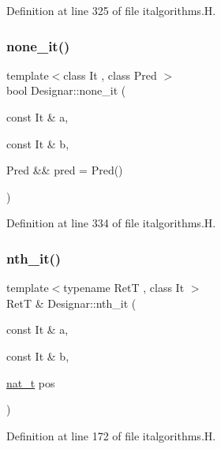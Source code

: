 Definition at line 325 of file italgorithms.\+H.

\mbox{\label{namespace_designar_a1db95e69891b9a861d56297c556a645b}} 
\subsubsection{\texorpdfstring{none\+\_\+it()}{none\_it()}\hspace{0.1cm}{\footnotesize\ttfamily [2/2]}}
{\footnotesize\ttfamily template$<$class It , class Pred $>$ \\
bool Designar\+::none\+\_\+it (\begin{DoxyParamCaption}\item[{const It \&}]{a,  }\item[{const It \&}]{b,  }\item[{Pred \&\&}]{pred = {\ttfamily Pred()} }\end{DoxyParamCaption})}



Definition at line 334 of file italgorithms.\+H.

\mbox{\label{namespace_designar_a6009b5708fa05c048e3d11a5893165d1}} 
\subsubsection{\texorpdfstring{nth\+\_\+it()}{nth\_it()}}
{\footnotesize\ttfamily template$<$typename RetT , class It $>$ \\
RetT \& Designar\+::nth\+\_\+it (\begin{DoxyParamCaption}\item[{const It \&}]{a,  }\item[{const It \&}]{b,  }\item[{\hyperlink{namespace_designar_aa72662848b9f4815e7bf31a7cf3e33d1}{nat\+\_\+t}}]{pos }\end{DoxyParamCaption})}



Definition at line 172 of file italgorithms.\+H.

\mbox{\label{namespace_designar_a72ca73ad8bb829f0ea703a0bfa62414c}} 
